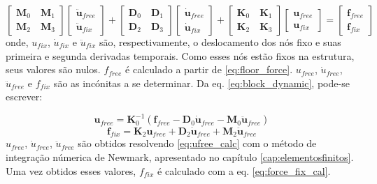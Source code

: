 \begin{equation} \label{eq:block_dynamic}
     \begin{bmatrix}
            \pmb{M}_0 \quad \pmb{M}_1 \\
            \pmb{M}_2 \quad \pmb{M}_3
    \end{bmatrix}
     \begin{bmatrix}
       \ddot{\pmb{u}}_{free} \\
       \ddot{\pmb{u}}_{fix} 
    \end{bmatrix}    
    + \begin{bmatrix}
            \pmb{D}_0 \quad \pmb{D}_1 \\
            \pmb{D}_2 \quad \pmb{D}_3
         \end{bmatrix}
         \begin{bmatrix}
            \dot{\pmb{u}}_{free} \\
            \dot{\pmb{u}}_{fix} 
         \end{bmatrix}
    + \begin{bmatrix}
            \pmb{K}_0 \quad \pmb{K}_1 \\
            \pmb{K}_2 \quad \pmb{K}_3
         \end{bmatrix}
         \begin{bmatrix}
            \pmb{u}_{free} \\
            \pmb{u}_{fix} 
         \end{bmatrix} =
         \begin{bmatrix}
            \pmb{f}_{free} \\
            \pmb{f}_{fix} 
    \end{bmatrix}
\end{equation}
onde, $u_{fix}$, $\dot{u}_{fix}$ e $\ddot{u}_{fix}$
são, respectivamente, o deslocamento dos nós fixo e suas primeira e segunda derivadas temporais. Como esses nós estão fixos na estrutura, seus valores são nulos. $f_{free}$ é calculado a partir de \ref{eq:floor_force}.
$u_{free}$, $\dot{u}_{free}$, $\ddot{u}_{free}$ e $f_{fix}$ são as incónitas a se determinar.
Da eq. \ref{eq:block_dynamic}, pode-se escrever:

\begin{equation} \label{eq:ufree_calc}
    \pmb{u}_{free} = \pmb{K}_0^{-1}(\pmb{f}_{free} - \pmb{D}_0 \dot{\pmb{u}}_{free} -\pmb{M}_0\ddot{\pmb{u}}_{free})     
\end{equation}
\begin{equation} \label{eq:force_fix_cal}
     \pmb{f}_{fix} = \pmb{K}_2 \pmb{u}_{free} + \pmb{D}_2 \dot{\pmb{u}}_{free} + \pmb{M}_2 \ddot{\pmb{u}}_{free}       
\end{equation}
$u_{free}$, $\dot{u}_{free}$, $\ddot{u}_{free}$ são obtidos resolvendo \ref{eq:ufree_calc} com o método de integração númerica de Newmark, apresentado no capítulo \ref{cap:elementosfinitos}. Uma vez obtidos esses valores, $f_{fix}$ é calculado com a eq. \ref{eq:force_fix_cal}.

